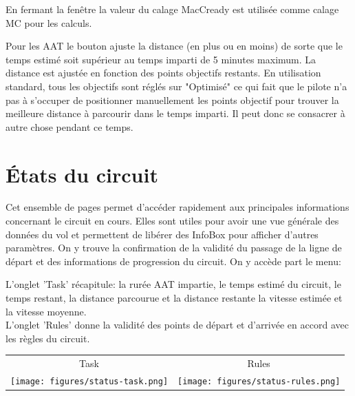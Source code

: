 En fermant la fenêtre la valeur du calage MacCready est utilisée comme calage MC pour les calculs. 

Pour les AAT le bouton  ajuste la distance (en plus ou en moins) de sorte que le temps estimé soit supérieur au temps imparti de 5 minutes maximum. La distance est ajustée en fonction des points objectifs restants. En utilisation standard, tous les objectifs sont réglés sur "Optimisé" ce qui fait que le pilote n'a pas à s'occuper de positionner manuellement les points objectif pour trouver la meilleure distance à parcourir dans le temps imparti. Il peut donc se consacrer à autre chose pendant ce temps.


\section{États du circuit}\label{sec:task-status}

Cet ensemble de pages permet d'accéder rapidement aux principales informations concernant le circuit en cours. Elles sont utiles pour avoir une vue générale des données du vol et permettent de libérer des InfoBox pour afficher d'autres paramètres. On y trouve la confirmation de la validité du passage de la ligne de départ et des informations de progression du circuit. On y accède part le menu:
\begin{quote}
\blink{}
\end{quote}

L'onglet 'Task' récapitule: la rurée AAT impartie, le temps estimé du circuit, le temps restant, la distance parcourue et la distance restante la vitesse estimée et la vitesse moyenne.\\
L'onglet 'Rules' donne la validité des points de départ et d'arrivée en accord avec les règles du circuit.
\begin{center}
\begin{tabular}{c c}
Task & Rules \\
\texttt{[image: figures/status-task.png]} &
\texttt{[image: figures/status-rules.png]} \\
\end{tabular}
\end{center}


